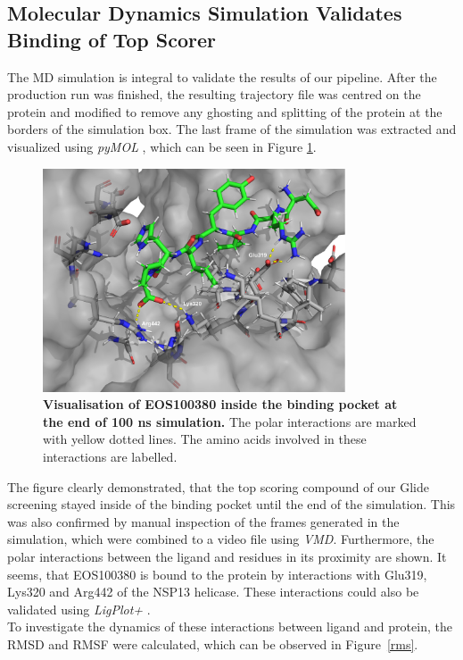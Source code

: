 \documentclass[11pt, letterpaper, titlepage]{article}
\renewcommand{\cite}{\parencite}
\begin{document}
\subsection{Molecular Dynamics Simulation Validates Binding of Top Scorer}
The \ac{MD} simulation is integral to validate the results of our pipeline. After the production run was finished, the resulting trajectory file was centred on the protein and modified to remove any ghosting and splitting of the protein at the borders of the simulation box. The last frame of the simulation was extracted and visualized using \textit{pyMOL} \cite{PyMOL}, which can be seen in Figure \ref{MD.Annotated}.
\begin{figure}[h]
  \begin{center}
    \includegraphics[width=0.8\textwidth]{last_frame_render_annotated.pdf}
  \end{center}
  \caption{\textbf{Visualisation of EOS100380 inside the binding pocket at the end of 100 ns simulation.} The polar interactions are marked with yellow dotted lines. The amino acids involved in these interactions are labelled.}\label{MD.Annotated}
\end{figure}
The figure clearly demonstrated, that the top scoring compound of our Glide screening stayed inside of the binding pocket until the end of the simulation. This was also confirmed by manual inspection of the frames generated in the simulation, which were combined to a video file using \textit{VMD}. Furthermore, the polar interactions between the ligand and residues in its proximity are shown. It seems, that EOS100380 is bound to the protein by interactions with Glu319, Lys320 and Arg442 of the NSP13 helicase. These interactions could also be validated using \textit{LigPlot+} \cite{LigPlot}.\\
To investigate the dynamics of these interactions between ligand and protein, the \ac{RMSD} and \ac{RMSF} were calculated, which can be observed in Figure~\ref{rms}. 
\end{document}
